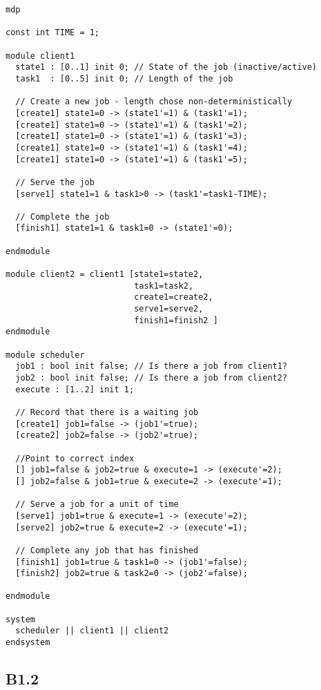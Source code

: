 \begin{verbatim}
mdp

const int TIME = 1;

module client1
  state1 : [0..1] init 0; // State of the job (inactive/active)
  task1  : [0..5] init 0; // Length of the job
  
  // Create a new job - length chose non-deterministically
  [create1] state1=0 -> (state1'=1) & (task1'=1);
  [create1] state1=0 -> (state1'=1) & (task1'=2);
  [create1] state1=0 -> (state1'=1) & (task1'=3);
  [create1] state1=0 -> (state1'=1) & (task1'=4);
  [create1] state1=0 -> (state1'=1) & (task1'=5);

  // Serve the job
  [serve1] state1=1 & task1>0 -> (task1'=task1-TIME);

  // Complete the job
  [finish1] state1=1 & task1=0 -> (state1'=0);

endmodule

module client2 = client1 [state1=state2,
                          task1=task2,
                          create1=create2,
                          serve1=serve2,
                          finish1=finish2 ]
endmodule

module scheduler
  job1 : bool init false; // Is there a job from client1?
  job2 : bool init false; // Is there a job from client2?
  execute : [1..2] init 1;

  // Record that there is a waiting job
  [create1] job1=false -> (job1'=true);
  [create2] job2=false -> (job2'=true);

  //Point to correct index
  [] job1=false & job2=true & execute=1 -> (execute'=2);
  [] job2=false & job1=true & execute=2 -> (execute'=1);

  // Serve a job for a unit of time
  [serve1] job1=true & execute=1 -> (execute'=2);  
  [serve2] job2=true & execute=2 -> (execute'=1);

  // Complete any job that has finished
  [finish1] job1=true & task1=0 -> (job1'=false);
  [finish2] job2=true & task2=0 -> (job2'=false);

endmodule

system
  scheduler || client1 || client2
endsystem

\end{verbatim}

\subsection{B1.2}

